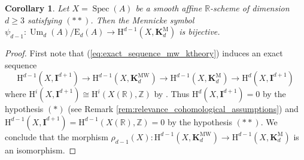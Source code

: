 \documentclass[11pt,leqno]{amsart}
\newcommand{\Spec}{\operatorname{Spec}}
\renewcommand{\1}{{\rm 1\hspace*{-0.4ex}%
\rule{0.1ex}{1.52ex}\hspace*{0.2ex}}}
\newcommand{\Hr}{{\mathrm {H}}}
\newcommand{\<}[1]{{\langle}#1 {\rangle}}
\newcommand{\Ibf}{\mathbf{I}}
\newcommand{\Rb}{\mathbb{R}}
\newcommand{\Zb}{\mathbb{Z}}
\newcommand{\Kbf}{\mathbf{K}}
\newcommand{\Er}{\mathrm{E}}
\newcommand{\Mr}{\mathrm{M}}
\newcommand{\Um}{\operatorname{Um}}
\newcommand{\MW}{\mathrm{MW}}
\theoremstyle{plain}
\newtheorem{cor}[thm]{Corollary}
\theoremstyle{definition}
\theoremstyle{remark}
\numberwithin{equation}{section}
\begin{document}
\begin{cor}\label{cor:mennicke_bijective}
Let $X=\Spec(A)$ be a smooth affine $\Rb$-scheme of dimension $d\geq 3$ satisfying $(**)$. Then the Mennicke symbol $\psi_{d-1}:\Um_d(A)/\Er_d(A)\to\Hr^{d-1}(X,\Kbf_d^\Mr)$ is bijective.
\end{cor}

\begin{proof}
First note that (\ref{eq:exact_sequence_mw_ktheory}) induces an exact sequence \[\Hr^{d-1}(X,\Ibf^{d+1})\to\Hr^{d-1}(X,\Kbf_d^\MW)\to\Hr^{d-1}(X,\Kbf_d^\Mr)\to\Hr^{d}(X,\Ibf^{d+1})\] where $\Hr^{i}(X,\Ibf^{d+1})\cong\Hr^i(X(\Rb),\Zb)$ by \cite[Corollary 8.11]{jacobsonRealCohomologyPowers2017}. Thus $\Hr^{d}(X,\Ibf^{d+1})=0$ by the hypothesis $(*)$ (see Remark \ref{rem:relevance_cohomological_assumptions}) and $\Hr^{d-1}(X,\Ibf^{d+1})=\Hr^{d-1}(X(\Rb),\Zb)=0$ by the hypothesis $(**)$. We conclude that the morphism $\rho_{d-1}(X):\Hr^{d-1}(X,\Kbf_d^\MW)\to\Hr^{d-1}(X,\Kbf_d^\Mr)$ is an isomorphism.


\end{proof}
\end{document}
